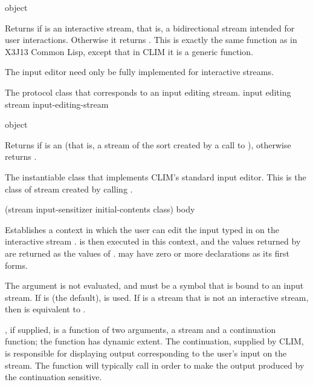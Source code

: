  {object}

Returns  if  is an interactive stream, that is, a
bidirectional stream intended for user interactions.  Otherwise it returns
.  This is exactly the same function as in X3J13 Common Lisp,
except that in CLIM it is a generic function.

The input editor need only be fully implemented for interactive streams.


The protocol class that corresponds to an input editing stream.
 {input editing stream} {input-editing-stream}

 {object}

Returns  if  is an  (that is,
a stream of the sort created by a call to ), otherwise
returns .


The instantiable class that implements CLIM's standard input editor.  This is
the class of stream created by calling .

\Mutable


 {(\optional stream 
                                 \key input-sensitizer initial-contents class)
                                \body body}

Establishes a context in which the user can edit the input typed in on the
interactive stream .   is then executed in this context,
and the values returned by  are returned as the values of
.   may have zero or more declarations as its
first forms.

The  argument is not evaluated, and must be a symbol that is bound
to an input stream.  If  is  (the default),
 is used.  If  is a stream that is not an
interactive stream, then  is equivalent to .

, if supplied, is a function of two arguments, a stream
and a continuation function; the function has dynamic extent.  The continuation,
supplied by CLIM, is responsible for displaying output corresponding to the
user's input on the stream.  The  function will typically call
 in order to make the output produced by the
continuation sensitive.

